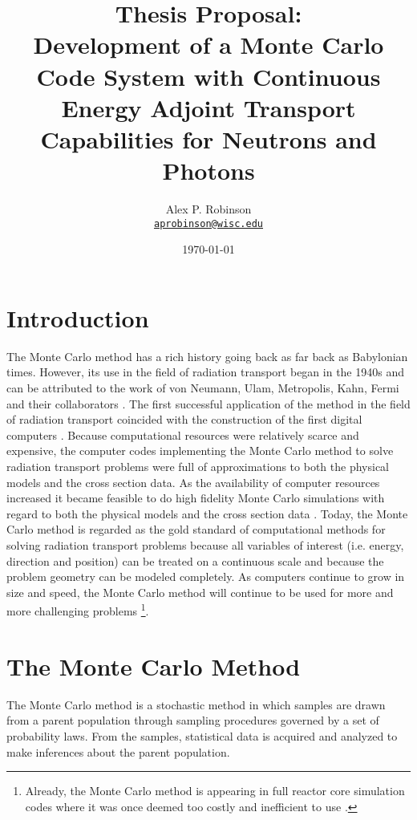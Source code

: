 \documentclass[letterpaper,12pt]{article}
\author{Alex P. Robinson
\\ \href{mailto:aprobinson@wisc.edu}{\texttt{aprobinson@wisc.edu}}
}
\date{\today}
\title{Thesis Proposal:\\
  Development of a Monte Carlo Code System with Continuous Energy Adjoint Transport Capabilities for Neutrons and Photons}
\begin{document}
\maketitle

\section{Introduction}
\label{ch:introduction}
The Monte Carlo method has a rich history going back as far back as Babylonian 
times. However, its use in the field of radiation transport began in the 1940s 
and can be attributed to the work of von Neumann, Ulam, Metropolis, Kahn, Fermi 
and their collaborators \cite{halton_retrospective_1970}. The first successful 
application of the method in the field of radiation transport coincided with 
the construction of the first digital computers \cite{lux_monte_1991}. Because 
computational resources were relatively scarce and expensive, the computer codes
implementing the Monte Carlo method to solve radiation transport problems were
full of approximations to both the physical models and the cross section data.
As the availability of computer resources increased it became 
feasible to do high fidelity Monte Carlo simulations with regard to both the 
physical models and the cross section data \cite{chucas_preparing_1994}. Today,
the Monte Carlo method is regarded as the gold standard of computational 
methods for solving radiation transport problems because all variables of 
interest (i.e. energy, direction and position) can be treated on a continuous
scale and because the problem geometry can be modeled completely. As 
computers continue to grow in size and speed, the Monte Carlo method will 
continue to be used for more and more challenging problems \footnote{Already, 
the Monte Carlo method is appearing in full reactor core simulation codes 
where it was once deemed too costly and inefficient to use 
\cite{hoogenboom_monte_2011}.}.

\section{The Monte Carlo Method}
\label{sec:monte_carlo_method}
The Monte Carlo method is a stochastic method in which samples are drawn from 
a parent population through sampling procedures governed by a set of 
probability laws. From the samples, statistical data is acquired and analyzed 
to make inferences about the parent population. 
\end{document}
